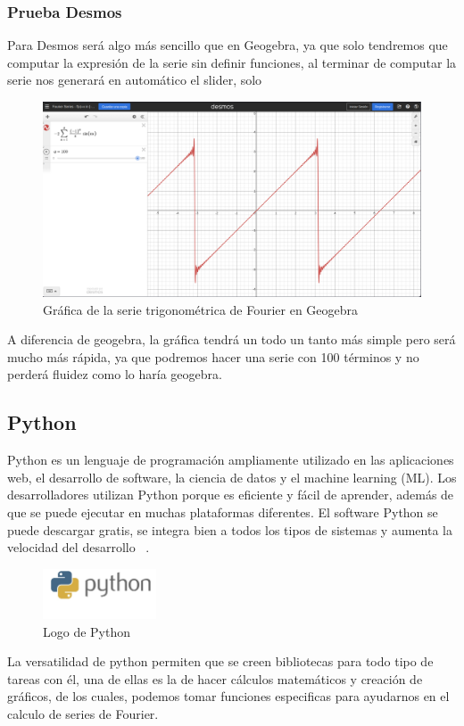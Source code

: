 \subsubsection{Prueba Desmos}
Para Desmos será algo más sencillo que en Geogebra, ya que solo tendremos que computar la expresión de la serie sin definir funciones, al terminar de computar la serie nos generará en automático el slider, solo 
\begin{figure}[H]
	\centering
	\includegraphics[width=1\textwidth]{img/chapter02/desmos-trig-series-graph.png}
	\caption{Gráfica de la serie trigonométrica de Fourier en Geogebra}
	\label{fig:desmos-trig-series}  %
\end{figure}
A diferencia de geogebra, la gráfica tendrá un todo un tanto más simple pero será mucho más rápida, ya que podremos hacer una serie con 100 términos y no perderá fluidez como lo haría geogebra.

\subsection{Python}
Python es un lenguaje de programación ampliamente utilizado en las aplicaciones web, el desarrollo de software, la ciencia de datos y el machine learning (ML). Los desarrolladores utilizan Python porque es eficiente y fácil de aprender, además de que se puede ejecutar en muchas plataformas diferentes. El software Python se puede descargar gratis, se integra bien a todos los tipos de sistemas y aumenta la velocidad del desarrollo ~\cite{amazonPython}.
\begin{figure}[H]
	\centering
	\includegraphics[width=0.3\textwidth]{img/chapter02/logo_python.png}
	\caption{Logo de Python}
	\label{fig:pythonl-ogo}  %
\end{figure}
La versatilidad de python permiten que se creen bibliotecas para todo tipo de tareas con él, una de ellas es la de hacer cálculos matemáticos y creación de gráficos, de los cuales, podemos tomar funciones especificas para ayudarnos en el calculo de series de Fourier. 

